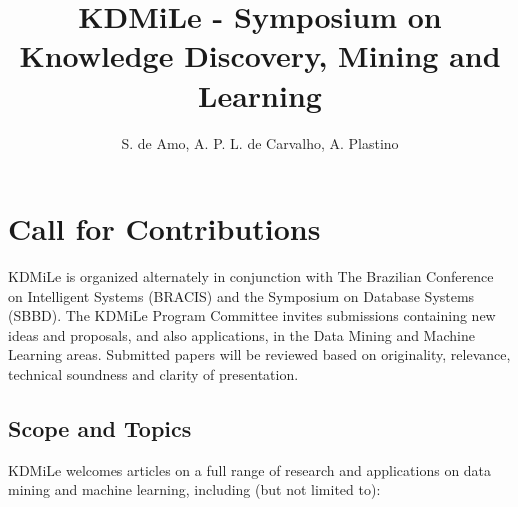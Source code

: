 \documentclass[kdmile,a4paper]{kdmile} %
\title{KDMiLe - Symposium on Knowledge Discovery, Mining and Learning}
\author{S. de Amo\inst{1}, A. P. L. de Carvalho\inst{2}, A. Plastino\inst{3}}
\institute{Universidade Federal de Uberl\^andia, Brazil \\ \email{deamo@ufu.br}
\and Universidade de São Paulo, Brazil  \\ \email{andre@icmc.usp.br}
\and Universidade Federal Fluminense, Brazil  \\ \email{plastino@icmc.usp.br}
}
\begin{document}
\begin{bottomstuff}
\end{bottomstuff}

\maketitle


\section{Call for Contributions}
KDMiLe is organized alternately in conjunction with The Brazilian Conference on Intelligent Systems (BRACIS) and the Symposium on Database Systems (SBBD). The KDMiLe Program Committee invites submissions containing new ideas and proposals, and also applications, in the Data Mining and Machine Learning areas. Submitted papers will be reviewed based on originality, relevance, technical soundness and clarity of presentation. 

\subsection{Scope and Topics}

KDMiLe welcomes articles on a full range of research and applications on data mining and machine learning, including (but not limited to):

\end{document}
